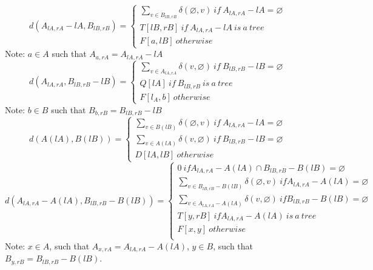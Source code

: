 \begin{equation}
d(A_{lA, rA} - lA, B_{lB, rB}) = \begin{cases}
\sum_{v \in B_{lB, rB}} \delta(\varnothing, v)\ if\ A_{lA, rA} - lA = \varnothing \\
T[lB, rB]\ if\ A_{lA, rA} - lA\ is\ a\ tree\\
F[a, lB]\ otherwise
\end{cases}
\end{equation}
Note: $a \in A$ such that $A_{a, rA} = A_{lA, rA} - lA$
\begin{equation}
d(A_{lA, rA}, B_{lB, rB} - lB) = \begin{cases}
\sum_{v \in A_{lA, rA}} \delta(v, \varnothing)\ if\ B_{lB, rB} - lB = \varnothing \\
Q[lA]\ if\ B_{lB, rB}\ is\ a\ tree\\
F[l_A, b]\ otherwise
\end{cases}
\end{equation}
Note: $b \in B$ such that $B_{b, rB} = B_{lB, rB} - lB$
\begin{equation}
d(A(lA), B(lB)) = \begin{cases}
\sum_{v \in B(lB)} \delta(\varnothing, v)\ if\  A_{lA, rA} - lA = \varnothing \\
\sum_{v \in A(lA)} \delta(v, \varnothing)\ if\ B_{lB, rB} - lB = \varnothing \\
D[lA, lB]\ otherwise  
\end{cases}
\end{equation}
\begin{equation}
d(A_{lA, rA} - A(lA), B_{lB, rB} - B(lB)) = \begin{cases}
0\ if A_{lA, rA} - A(lA) \cap B_{lB, rB} - B(lB) = \varnothing \\
\sum_{v \in B_{lB, rB} - B(lB)} \delta(\varnothing, v)\ if A_{lA, rA} - A(lA) = \varnothing \\
\sum_{v \in A_{lA, rA} - A(lA)} \delta(v, \varnothing)\ if B_{lB, rB} - B(lB) = \varnothing \\
T[y, rB]\ if A_{lA, rA} - A(lA)\ is\ a\ tree\\
F[x, y]\ otherwise\\
\end{cases}
\end{equation}
Note: $x \in A$, such that $A_{x, rA} = A_{lA, rA} - A(lA)$, $y \in B$, such that $B_{y, rB} = B_{lB, rB} - B(lB)$.
